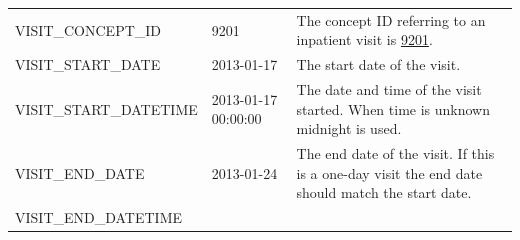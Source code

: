 \documentclass[]{book}
\begin{document}
\begin{longtable}[]{@{}lll@{}}
\begin{minipage}[t]{0.25\columnwidth}\raggedright\strut
VISIT\_CONCEPT\_ID\strut
\end{minipage} & \begin{minipage}[t]{0.17\columnwidth}\raggedright\strut
9201\strut
\end{minipage} & \begin{minipage}[t]{0.49\columnwidth}\raggedright\strut
The concept ID referring to an inpatient visit is
\href{http://athena.ohdsi.org/search-terms/terms/9201}{9201}.\strut
\end{minipage}\tabularnewline
\begin{minipage}[t]{0.25\columnwidth}\raggedright\strut
VISIT\_START\_DATE\strut
\end{minipage} & \begin{minipage}[t]{0.17\columnwidth}\raggedright\strut
2013-01-17\strut
\end{minipage} & \begin{minipage}[t]{0.49\columnwidth}\raggedright\strut
The start date of the visit.\strut
\end{minipage}\tabularnewline
\begin{minipage}[t]{0.25\columnwidth}\raggedright\strut
VISIT\_START\_DATETIME\strut
\end{minipage} & \begin{minipage}[t]{0.17\columnwidth}\raggedright\strut
2013-01-17 00:00:00\strut
\end{minipage} & \begin{minipage}[t]{0.49\columnwidth}\raggedright\strut
The date and time of the visit started. When time is unknown midnight is
used.\strut
\end{minipage}\tabularnewline
\begin{minipage}[t]{0.25\columnwidth}\raggedright\strut
VISIT\_END\_DATE\strut
\end{minipage} & \begin{minipage}[t]{0.17\columnwidth}\raggedright\strut
2013-01-24\strut
\end{minipage} & \begin{minipage}[t]{0.49\columnwidth}\raggedright\strut
The end date of the visit. If this is a one-day visit the end date
should match the start date.\strut
\end{minipage}\tabularnewline
\begin{minipage}[t]{0.25\columnwidth}\raggedright\strut
VISIT\_END\_DATETIME\strut
\end{minipage} & \begin{minipage}[t]{0.17\columnwidth}\raggedright\strut

\end{minipage}
\end{longtable}
\end{document}
